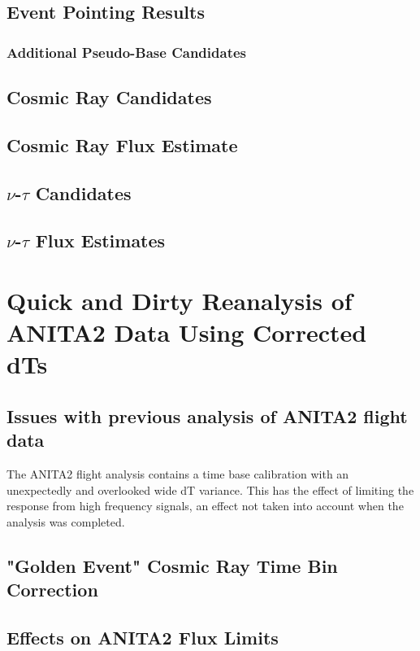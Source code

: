 \section{Event Pointing Results}
	\subsection{Additional Pseudo-Base Candidates}


\section{Cosmic Ray Candidates}

\section{Cosmic Ray Flux Estimate}

\section{$\nu$-$\tau$ Candidates}

\section{$\nu$-$\tau$ Flux Estimates}

			
\chapter{Quick and Dirty Reanalysis of ANITA2 Data Using Corrected dTs}
\section{Issues with previous analysis of ANITA2 flight data}
	The ANITA2 flight analysis contains a time base calibration with an unexpectedly and overlooked wide dT variance.  This has the effect of limiting the response from high frequency signals, an effect not taken into account when the analysis was completed.

\section{"Golden Event" Cosmic Ray Time Bin Correction}

\section{Effects on ANITA2 Flux Limits}
			
